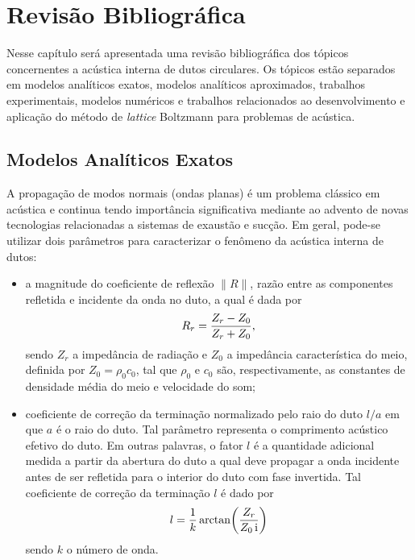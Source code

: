 \chapter{Revisão Bibliográfica}

Nesse capítulo será apresentada uma revisão bibliográfica dos tópicos concernentes a acústica interna de dutos circulares. Os tópicos estão separados em modelos analíticos exatos, modelos analíticos aproximados, trabalhos experimentais, modelos numéricos e trabalhos relacionados ao desenvolvimento e aplicação do método de \textit{lattice} Boltzmann para problemas de acústica.

\section{Modelos Analíticos Exatos} 

A propagação de modos normais (ondas planas) é um problema clássico em acústica e continua tendo importância significativa mediante ao advento de novas tecnologias relacionadas a sistemas de exaustão e sucção. Em geral, pode-se utilizar dois parâmetros para caracterizar o fenômeno da acústica interna de dutos:

\begin{itemize}
    \item a magnitude do coeficiente de reflexão $\|R\|$, razão entre as componentes refletida e incidente da onda no duto, a qual é dada por
    \begin{equation}
        R_{r}\simbolo{$R_{r}$}{Coeficiente de reflexão na terminação do duto} =\frac{Z_{r} - Z_{0}}{Z_{r} + Z_{0}},
        \label{eq:R}
    \end{equation}
    sendo $Z_{r}$ a impedância de radiação e $Z_{0}$ a impedância característica do meio, definida por $Z_{0} = \rho_{0}c_{0}$, tal que $\rho_{0}$ e $c_{0}$ são, respectivamente, as constantes de densidade média do meio e velocidade do som;
    
    \item coeficiente de correção da terminação normalizado pelo raio do duto $l/a$ em que $a$ é o raio do duto. Tal parâmetro representa o comprimento acústico efetivo do duto. Em outras palavras, o fator $l$ é a quantidade adicional medida a partir da abertura do duto a qual deve propagar a onda incidente antes de ser refletida para o interior do duto com fase invertida. Tal coeficiente de correção da terminação $l$ é dado por
    \begin{equation}
        l = \frac{1}{k} \arctan\!\left(\frac{Z_{r}}{Z_{0} \, \mathrm{i}\simbolo{$i$}{Unidade imaginária}}\right)
        \label{eq:l}
    \end{equation}
    sendo $k$ o número de onda.
\end{itemize}

